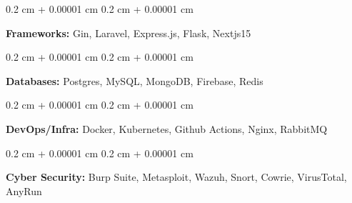 \documentclass[10pt, letterpaper]{article}
\newenvironment{onecolentry}{
    \begin{adjustwidth}{
        0.2 cm + 0.00001 cm
    }{
        0.2 cm + 0.00001 cm
    }
}{
    \end{adjustwidth}
} %
\begin{document}
        \vspace{0.2 cm}

        \begin{onecolentry}
            \textbf{Frameworks:} Gin, Laravel, Express.js, Flask, Nextjs15
        \end{onecolentry}

        \vspace{0.2 cm}

        \begin{onecolentry}
            \textbf{Databases:} Postgres, MySQL, MongoDB, Firebase, Redis
        \end{onecolentry}

        \vspace{0.2 cm}

        \begin{onecolentry}
            \textbf{DevOps/Infra:} Docker, Kubernetes, Github Actions, Nginx, RabbitMQ
        \end{onecolentry}
    
        \vspace{0.2 cm}

        \begin{onecolentry}
            \textbf{Cyber Security:} Burp Suite, Metasploit, Wazuh, Snort, Cowrie, VirusTotal, AnyRun
        \end{onecolentry}

    
\end{document}
